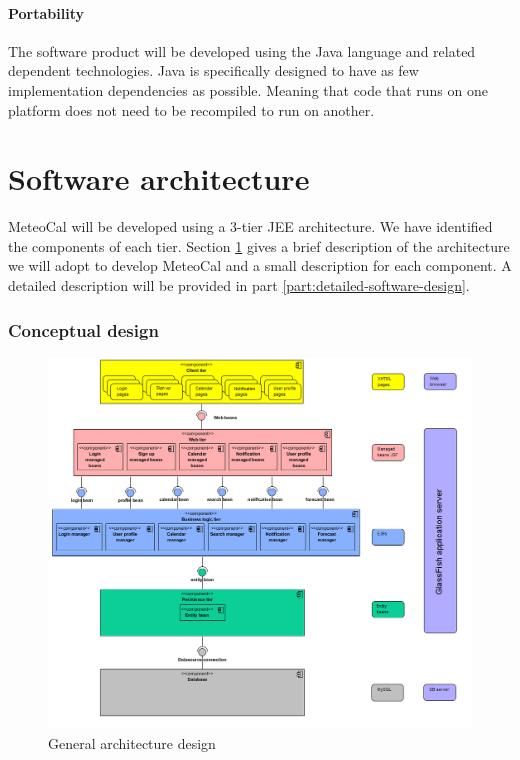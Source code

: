 \documentclass[10pt,a4paper,titlepage]{article}
\begin{document}
\subsection{Portability}
The software product will be developed using the Java language and related dependent technologies. Java is specifically designed to have as few implementation dependencies as possible. Meaning that code that runs on one platform does not need to be recompiled to run on another.

\clearpage
\part{Software architecture}
\label{part:software-architecture}
MeteoCal will be developed using a 3-tier JEE architecture. We have identified the components of each tier. Section \ref{sec:conceptual-design} gives a brief description of the architecture we will adopt to develop MeteoCal and a small description for each component. A detailed description will be provided in part \ref{part:detailed-software-design}.

\section{Conceptual design}
\label{sec:conceptual-design}
\begin{figure}[htp]
\centering
\includegraphics[width=\linewidth]{./images/general_architecture_design}
\caption[General architecture]{General architecture design}
\label{fig:general-architecture}
\end{figure}
\end{document}
